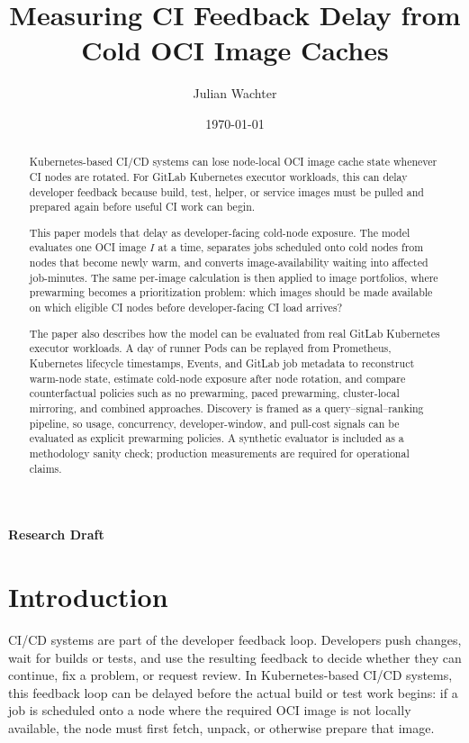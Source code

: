 \documentclass[11pt,a4paper]{article}
\title{Measuring CI Feedback Delay from Cold OCI Image Caches}
\author{Julian Wachter}
\date{\today}
\begin{document}
\maketitle

\begin{center}
\textcolor{red!70!black}{\textbf{Research Draft}}
\end{center}


\begin{abstract}
Kubernetes-based CI/CD systems can lose node-local OCI image cache state whenever CI nodes are rotated. For GitLab Kubernetes executor workloads, this can delay developer feedback because build, test, helper, or service images must be pulled and prepared again before useful CI work can begin.

This paper models that delay as developer-facing cold-node exposure. The model evaluates one OCI image \(I\) at a time, separates jobs scheduled onto cold nodes from nodes that become newly warm, and converts image-availability waiting into affected job-minutes. The same per-image calculation is then applied to image portfolios, where prewarming becomes a prioritization problem: which images should be made available on which eligible CI nodes before developer-facing CI load arrives?

The paper also describes how the model can be evaluated from real GitLab Kubernetes executor workloads. A day of runner Pods can be replayed from Prometheus, Kubernetes lifecycle timestamps, Events, and GitLab job metadata to reconstruct warm-node state, estimate cold-node exposure after node rotation, and compare counterfactual policies such as no prewarming, paced prewarming, cluster-local mirroring, and combined approaches. Discovery is framed as a query--signal--ranking pipeline, so usage, concurrency, developer-window, and pull-cost signals can be evaluated as explicit prewarming policies. A synthetic evaluator is included as a methodology sanity check; production measurements are required for operational claims.
\end{abstract}

\section{Introduction}

CI/CD systems are part of the developer feedback loop. Developers push changes, wait for builds or tests, and use the resulting feedback to decide whether they can continue, fix a problem, or request review. In Kubernetes-based CI/CD systems, this feedback loop can be delayed before the actual build or test work begins: if a job is scheduled onto a node where the required OCI image is not locally available, the node must first fetch, unpack, or otherwise prepare that image.
\end{document}
